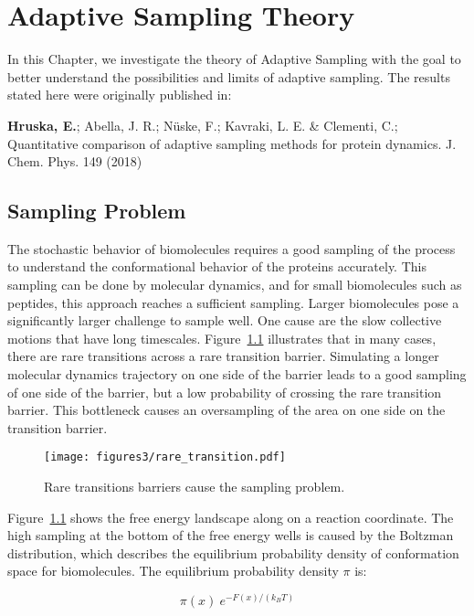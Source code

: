\afterpage{\null\newpage}
\chapter{Adaptive Sampling Theory\label{ch:chapter3}}


In this Chapter, we investigate the theory of Adaptive Sampling with the goal to better understand the possibilities and limits of adaptive sampling. The results stated here were originally published in: 

\cite{Adstrategies2018} \textbf{Hruska, E.}; Abella, J. R.; N\"uske, F.;
Kavraki, L. E. \& Clementi, C.; Quantitative
comparison of adaptive sampling methods
for protein dynamics. J. Chem. Phys. 149 (2018) 

\section{Sampling Problem}

The stochastic behavior of biomolecules requires a good sampling of the process to understand the conformational behavior of the proteins accurately. This sampling can be done by molecular dynamics, and for small biomolecules such as peptides, this approach reaches a sufficient sampling. Larger biomolecules pose a significantly larger challenge to sample well. One cause are the slow collective motions that have long timescales. Figure~\ref{fig:raretransitions} illustrates that in many cases, there are rare transitions across a rare transition barrier. Simulating a longer molecular dynamics trajectory on one side of the barrier leads to a good sampling of one side of the barrier, but a low probability of crossing the rare transition barrier. This bottleneck causes an oversampling of the area on one side on the transition barrier.  

\begin{figure}[H]
  \centering
  \texttt{[image: figures3/rare\_transition.pdf]}
  \caption{Rare transitions barriers cause the sampling problem.}
  \label{fig:raretransitions}
\end{figure}

Figure~\ref{fig:raretransitions} shows the free energy landscape along on a reaction coordinate. The high sampling at the bottom of the free energy wells is caused by the Boltzman distribution, which describes the equilibrium probability density of conformation space for biomolecules. The equilibrium probability density $\pi$ is:

$$\pi(x)~e^{-F(x)/(k_{B}T)}$$

